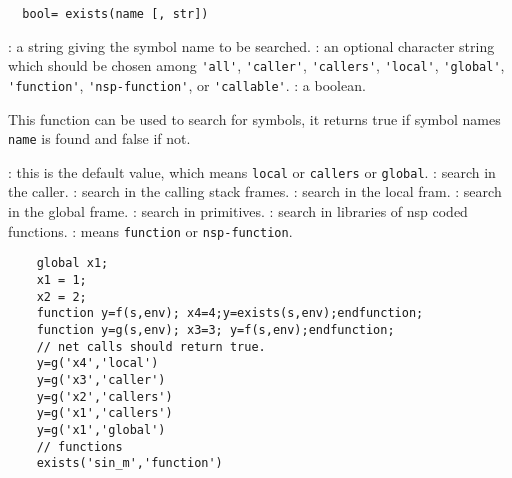 \begin{mandesc}
\end{mandesc}
\begin{calling_sequence}
\begin{verbatim}
  bool= exists(name [, str])  
\end{verbatim}
\end{calling_sequence}
\begin{parameters}
  \begin{varlist}
    : a string giving the symbol name to be searched.
    : an optional character string which should be chosen 
    among \verb+'all'+, \verb+'caller'+, \verb+'callers'+, \verb+'local'+,
    \verb+'global'+, \verb+'function'+, \verb+'nsp-function'+, or 
    \verb+'callable'+.
    : a boolean. 
  \end{varlist}
\end{parameters}
\begin{mandescription}
  This function can be used to search for symbols, it returns true if 
  symbol names \verb+name+ is found and false if not. 
  \begin{varlist}
    : this is the default value, which  means \verb+local+ or 
    \verb+callers+ or \verb+global+.
    :  search in the caller. 
    : search in the calling stack frames.
    : search in the local fram.
    : search in the global frame.
    : search in primitives. 
    : search in libraries of nsp coded functions.
    : means \verb+function+ or \verb+nsp-function+.
  \end{varlist}
\end{mandescription}
\begin{examples}
  \begin{Verbatim}
    global x1;
    x1 = 1;
    x2 = 2;
    function y=f(s,env); x4=4;y=exists(s,env);endfunction;
    function y=g(s,env); x3=3; y=f(s,env);endfunction;
    // net calls should return true.
    y=g('x4','local')
    y=g('x3','caller')
    y=g('x2','callers')
    y=g('x1','callers')
    y=g('x1','global')
    // functions 
    exists('sin_m','function')
  \end{Verbatim}
\end{examples}
\begin{manseealso}
\end{manseealso}
